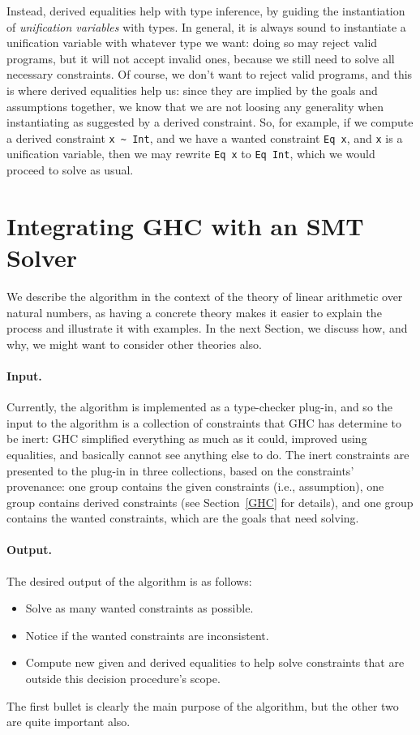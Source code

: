 \documentclass{sigplanconf}
\begin{document}
Instead, derived equalities help with type inference, by guiding the
instantiation of {\em unification variables} with types. In general,
it is always sound to instantiate a unification variable with whatever
type we want: doing so may reject valid programs, but it will not accept
invalid ones, because we still need to solve all necessary constraints.
Of course, we don't want to reject valid programs, and this is where derived
equalities help us: since they are implied by the goals and assumptions
together, we know that we are not loosing any generality when instantiating
as suggested by a derived constraint.  So, for example, if we compute a
derived constraint \Verb"x ~ Int", and we have a wanted constraint
\Verb"Eq x", and \Verb"x" is a unification variable, then we may
rewrite \Verb"Eq x" to \Verb"Eq Int", which we would proceed to solve
as usual.

\section{Integrating GHC with an SMT Solver}

We describe the algorithm in the context of the theory of linear arithmetic
over natural numbers, as having a concrete theory makes it easier to explain
the process and illustrate it with examples.  In the next Section,
we discuss how, and why, we might want to consider other theories also.

\paragraph{Input.} Currently, the algorithm is implemented as a type-checker
plug-in, and so the input to the algorithm is a collection of constraints
that GHC has determine to be inert: GHC simplified everything as much
as it could, improved using equalities, and basically cannot see anything
else to do.  The inert constraints are presented to the plug-in in three
collections, based on the constraints' provenance: one group contains
the given constraints (i.e., assumption), one group contains derived
constraints (see Section~\ref{GHC} for details), and one group contains
the wanted constraints, which are the goals that need solving.

\paragraph{Output.} The desired output of the algorithm is as follows:
\begin{itemize}
  \item Solve as many wanted constraints as possible.
  \item Notice if the wanted constraints are inconsistent.
  \item Compute new given and derived equalities to help solve constraints
        that are outside this decision procedure's scope.
\end{itemize}
The first bullet is clearly the main purpose of the algorithm, but the other
two are quite important also.
\end{document}
